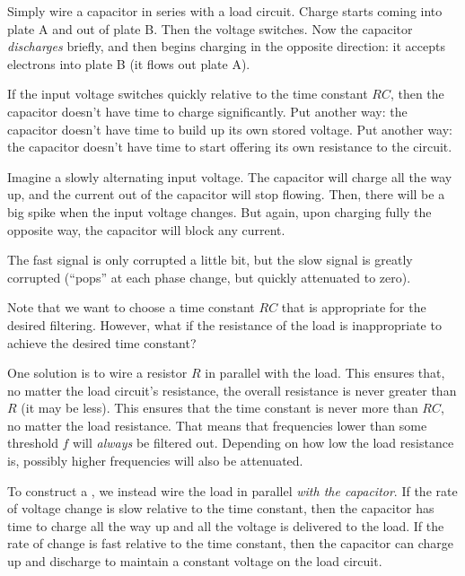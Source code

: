 \documentclass[11pt, oneside]{amsart}
\begin{document}
Simply wire a capacitor in series with a load circuit. Charge starts
coming into plate A and out of plate B. Then the voltage switches. Now
the capacitor \emph{discharges} briefly, and then begins charging in the
opposite direction: it accepts electrons into plate B (it flows out plate
A).

If the input voltage switches quickly relative to the time constant
$RC$, then the capacitor doesn't have time to charge significantly. Put
another way: the capacitor doesn't have time to build up its own stored
voltage. Put another way: the capacitor doesn't have time to start
offering its own resistance to the circuit.

Imagine a slowly alternating input voltage. The capacitor will charge
all the way up, and the current out of the capacitor will stop flowing.
Then, there will be a big spike when the input voltage changes. But
again, upon charging fully the opposite way, the capacitor will block
any current.

The fast signal is only corrupted a little bit, but the slow signal is
greatly corrupted (``pops'' at each phase change, but quickly attenuated
to zero).

Note that we want to choose a time constant $RC$ that is appropriate for
the desired filtering. However, what if the resistance of the load is
inappropriate to achieve the desired time constant?

One solution is to wire a resistor $R$ in parallel with the load. This
ensures that, no matter the load circuit's resistance, the overall
resistance is never greater than $R$ (it may be less). This ensures that
the time constant is never more than $RC$, no matter the load
resistance. That means that frequencies lower than some threshold $f$
will \emph{always} be filtered out. Depending on how low the load
resistance is, possibly higher frequencies will also be attenuated.

To construct a , we instead wire the load in
parallel \emph{with the capacitor}. If the rate of voltage change is
slow relative to the time constant, then the capacitor has time to
charge all the way up and all the voltage is delivered to the load. If
the rate of change is fast relative to the time constant, then the
capacitor can charge up and discharge to maintain a constant voltage on
the load circuit.

%
\end{document}
